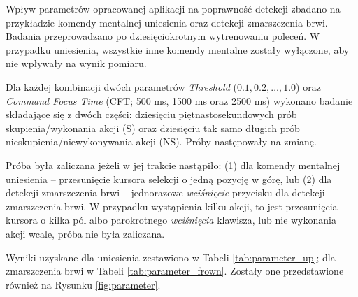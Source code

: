 \documentclass[skorowidz,skroty]{dyplomWEZUT}
\begin{document}
Wpływ parametrów opracowanej aplikacji na poprawność detekcji zbadano na przykładzie komendy mentalnej uniesienia oraz detekcji zmarszczenia brwi. Badania przeprowadzano po dziesięciokrotnym wytrenowaniu poleceń. W przypadku uniesienia, wszystkie inne komendy mentalne zostały wyłączone, aby nie wpływały na wynik pomiaru.

Dla każdej kombinacji dwóch parametrów \textit{Threshold} ($0.1, 0.2, \dots, 1.0$) oraz \textit{Command Focus Time} (CFT; 500 ms, 1500 ms oraz 2500 ms) wykonano badanie składające się z dwóch części: dziesięciu piętnastosekundowych prób skupienia/wykonania akcji (S) oraz dziesięciu tak samo długich prób nieskupienia/niewykonywania akcji (NS). Próby następowały na zmianę.

Próba była zaliczana jeżeli w jej trakcie nastąpiło: (1) dla komendy mentalnej uniesienia -- przesunięcie kursora selekcji o jedną pozycję w górę, lub (2) dla detekcji zmarszczenia brwi -- jednorazowe \textit{wciśnięcie} przycisku dla detekcji zmarszczenia brwi. W przypadku wystąpienia kilku akcji, to jest przesunięcia kursora o kilka pól albo parokrotnego \textit{wciśnięcia} klawisza, lub nie wykonania akcji wcale, próba nie była zaliczana.

Wyniki uzyskane dla uniesienia zestawiono w Tabeli \vref{tab:parameter_up}; dla zmarszczenia brwi w Tabeli \vref{tab:parameter_frown}. Zostały one przedstawione również na Rysunku \vref{fig:parameter}.
\end{document}

